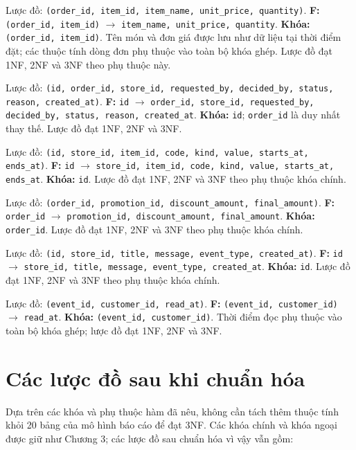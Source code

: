 \begin{description}[leftmargin=4.1cm,labelwidth=3.9cm,style=nextline]
  \item[15. \texttt{menu\_order\_items}] Lược đồ: \texttt{(order\_id, item\_id, item\_name, unit\_price, quantity)}. \textbf{F:} \texttt{(order\_id, item\_id)} $\rightarrow$ \texttt{item\_name, unit\_price, quantity}. \textbf{Khóa:} \texttt{(order\_id, item\_id)}. Tên món và đơn giá được lưu như dữ liệu tại thời điểm đặt; các thuộc tính dòng đơn phụ thuộc vào toàn bộ khóa ghép. Lược đồ đạt 1NF, 2NF và 3NF theo phụ thuộc này.
  \item[16. \texttt{pos\_order\_reversals}] Lược đồ: \texttt{(id, order\_id, store\_id, requested\_by, decided\_by, status, reason, created\_at)}. \textbf{F:} \texttt{id} $\rightarrow$ \texttt{order\_id, store\_id, requested\_by, decided\_by, status, reason, created\_at}. \textbf{Khóa:} \texttt{id}; \texttt{order\_id} là duy nhất thay thế. Lược đồ đạt 1NF, 2NF và 3NF.
  \item[17. \texttt{menu\_promotions}] Lược đồ: \texttt{(id, store\_id, item\_id, code, kind, value, starts\_at, ends\_at)}. \textbf{F:} \texttt{id} $\rightarrow$ \texttt{store\_id, item\_id, code, kind, value, starts\_at, ends\_at}. \textbf{Khóa:} \texttt{id}. Lược đồ đạt 1NF, 2NF và 3NF theo phụ thuộc khóa chính.
  \item[18. \texttt{menu\_order\_pricing}] Lược đồ: \texttt{(order\_id, promotion\_id, discount\_amount, final\_amount)}. \textbf{F:} \texttt{order\_id} $\rightarrow$ \texttt{promotion\_id, discount\_amount, final\_amount}. \textbf{Khóa:} \texttt{order\_id}. Lược đồ đạt 1NF, 2NF và 3NF theo phụ thuộc khóa chính.
  \item[19. \texttt{customer\_notification\_events}] Lược đồ: \texttt{(id, store\_id, title, message, event\_type, created\_at)}. \textbf{F:} \texttt{id} $\rightarrow$ \texttt{store\_id, title, message, event\_type, created\_at}. \textbf{Khóa:} \texttt{id}. Lược đồ đạt 1NF, 2NF và 3NF theo phụ thuộc khóa chính.
  \item[20. \texttt{customer\_notification\_reads}] Lược đồ: \texttt{(event\_id, customer\_id, read\_at)}. \textbf{F:} \texttt{(event\_id, customer\_id)} $\rightarrow$ \texttt{read\_at}. \textbf{Khóa:} \texttt{(event\_id, customer\_id)}. Thời điểm đọc phụ thuộc vào toàn bộ khóa ghép; lược đồ đạt 1NF, 2NF và 3NF.
\end{description}

\section{Các lược đồ sau khi chuẩn hóa}
Dựa trên các khóa và phụ thuộc hàm đã nêu, không cần tách thêm thuộc tính khỏi 20 bảng của mô hình báo cáo để đạt 3NF. Các khóa chính và khóa ngoại được giữ như Chương 3; các lược đồ sau chuẩn hóa vì vậy vẫn gồm:

